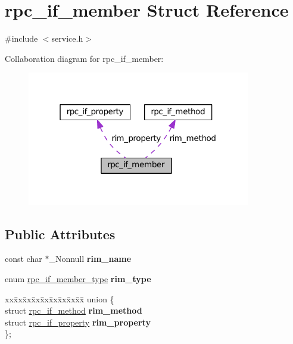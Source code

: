 \hypertarget{structrpc__if__member}{}\section{rpc\+\_\+if\+\_\+member Struct Reference}
\label{structrpc__if__member}


{\ttfamily \#include $<$service.\+h$>$}



Collaboration diagram for rpc\+\_\+if\+\_\+member\+:
\nopagebreak
\begin{figure}[H]
\begin{center}
\leavevmode
\includegraphics[width=277pt]{structrpc__if__member__coll__graph}
\end{center}
\end{figure}
\subsection*{Public Attributes}
\begin{DoxyCompactItemize}
\item 
\mbox{\label{structrpc__if__member_a656607611d627c965972e4153523287e}} 
const char $\ast$\+\_\+\+Nonnull {\bfseries rim\+\_\+name}
\item 
\mbox{\label{structrpc__if__member_a0ffdb5e81a707932149376d01c716b10}} 
enum \hyperlink{service_8h_a543850b4e1fac65207114c51d9c3f1a4}{rpc\+\_\+if\+\_\+member\+\_\+type} {\bfseries rim\+\_\+type}
\item 
\mbox{\label{structrpc__if__member_a7c950b405b6852b3038ae847d0b7e2e0}} 
\begin{tabbing}
xx\=xx\=xx\=xx\=xx\=xx\=xx\=xx\=xx\=\kill
union \{\\
\>struct \hyperlink{structrpc__if__method}{rpc\_if\_method} {\bfseries rim\_method}\\
\>struct \hyperlink{structrpc__if__property}{rpc\_if\_property} {\bfseries rim\_property}\\
\}; \\

\end{tabbing}\end{DoxyCompactItemize}


